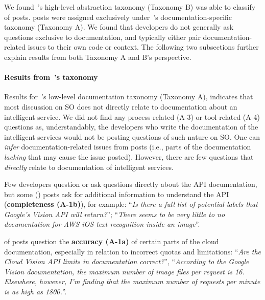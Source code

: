 We found~\citeauthor{Beyer:2018fm}'s high-level abstraction taxonomy (Taxonomy B) was able to classify \PctTaxBCategorised{} of posts.  \PctTaxACategorised{} posts were assigned exclusively under~\citeauthor{Aghajani:2019bo}'s documentation-specific taxonomy (Taxonomy A). 
We found that developers do not generally ask questions exclusive to documentation, and typically either pair documentation-related issues to their own code or context. The following two subsections further explain results from both Taxonomy A and B's perspective.

\paragraph{Results from~\citeauthor{Aghajani:2019bo}'s taxonomy}

Results for~\citeauthor{Aghajani:2019bo}'s low-level documentation taxonomy (Taxonomy A), indicates that most discussion on SO does not directly relate to documentation about an intelligent service. We did not find any process-related (A-3) or tool-related (A-4) questions as, understandably, the developers who write the documentation of the intelligent services would not be posting questions of such nature on SO.
One can \textit{infer} documentation-related issues from posts (i.e., parts of the documentation \textit{lacking} that may cause the issue posted). However, there are few questions that \textit{directly} relate to documentation of intelligent services.


Few developers question or ask questions directly about the API documentation, but some (\PctTaxACompleteness{}) posts ask for additional information to understand the API (\textbf{completeness (A-1b)}), for example: ``\textit{Is there a full list of potential labels that Google's Vision API will return?}''; ``\textit{There seems to be very little to no documentation for AWS iOS text recognition inside an image}''. 

\PctTaxACorrectness{} of posts question the \textbf{accuracy (A-1a)} of certain parts of the cloud documentation, especially in relation to incorrect quotas and limitations: ``\textit{Are the Cloud Vision API limits in documentation correct?}'', ``\textit{According to the Google Vision documentation, the maximum number of image files per request is 16. Elsewhere, however, I'm finding that the maximum number of requests per minute is as high as 1800.}''. 

